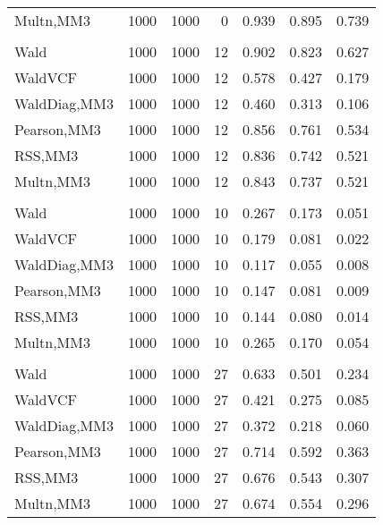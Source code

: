 \documentclass[
]{article}
\begin{document}
\begin{table}[H]
{\begin{tabular}[t]{lrrrrrr}
\hspace{1em}Multn,MM3 & 1000 & 1000 & 0 & 0.939 & 0.895 & 0.739\\
\addlinespace[0.3em]
\multicolumn{7}{l}{\textbf{1F 15V}}\\
\hspace{1em}Wald & 1000 & 1000 & 12 & 0.902 & 0.823 & 0.627\\
\hspace{1em}WaldVCF & 1000 & 1000 & 12 & 0.578 & 0.427 & 0.179\\
\hspace{1em}WaldDiag,MM3 & 1000 & 1000 & 12 & 0.460 & 0.313 & 0.106\\
\hspace{1em}Pearson,MM3 & 1000 & 1000 & 12 & 0.856 & 0.761 & 0.534\\
\hspace{1em}RSS,MM3 & 1000 & 1000 & 12 & 0.836 & 0.742 & 0.521\\
\hspace{1em}Multn,MM3 & 1000 & 1000 & 12 & 0.843 & 0.737 & 0.521\\
\addlinespace[0.3em]
\multicolumn{7}{l}{\textbf{2F 10V}}\\
\hspace{1em}Wald & 1000 & 1000 & 10 & 0.267 & 0.173 & 0.051\\
\hspace{1em}WaldVCF & 1000 & 1000 & 10 & 0.179 & 0.081 & 0.022\\
\hspace{1em}WaldDiag,MM3 & 1000 & 1000 & 10 & 0.117 & 0.055 & 0.008\\
\hspace{1em}Pearson,MM3 & 1000 & 1000 & 10 & 0.147 & 0.081 & 0.009\\
\hspace{1em}RSS,MM3 & 1000 & 1000 & 10 & 0.144 & 0.080 & 0.014\\
\hspace{1em}Multn,MM3 & 1000 & 1000 & 10 & 0.265 & 0.170 & 0.054\\
\addlinespace[0.3em]
\multicolumn{7}{l}{\textbf{3F 15V}}\\
\hspace{1em}Wald & 1000 & 1000 & 27 & 0.633 & 0.501 & 0.234\\
\hspace{1em}WaldVCF & 1000 & 1000 & 27 & 0.421 & 0.275 & 0.085\\
\hspace{1em}WaldDiag,MM3 & 1000 & 1000 & 27 & 0.372 & 0.218 & 0.060\\
\hspace{1em}Pearson,MM3 & 1000 & 1000 & 27 & 0.714 & 0.592 & 0.363\\
\hspace{1em}RSS,MM3 & 1000 & 1000 & 27 & 0.676 & 0.543 & 0.307\\
\hspace{1em}Multn,MM3 & 1000 & 1000 & 27 & 0.674 & 0.554 & 0.296\\
\bottomrule
\end{tabular}}
\endgroup{}
\end{table}
\end{document}
